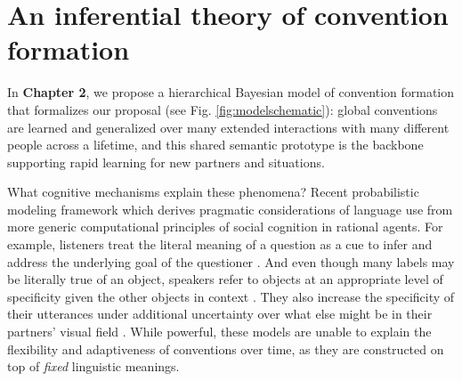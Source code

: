 \documentclass[11pt]{article}
\begin{document}
\vspace{1cm}

\section*{An inferential theory of convention formation}

In \textbf{Chapter 2}, we propose a hierarchical Bayesian model of convention formation that formalizes our proposal (see Fig. \ref{fig:modelschematic}): global conventions are learned and generalized over many extended interactions with many different people across a lifetime, and this shared semantic prototype is the backbone supporting rapid learning for new partners and situations. 

What cognitive mechanisms explain these phenomena? 
Recent probabilistic modeling framework which derives pragmatic considerations of language use from more generic computational principles of social cognition in rational agents.
For example, listeners treat the literal meaning of a question as a cue to infer and address the underlying goal of the questioner {\color{Red} \textbf{}}. 
And even though many labels may be literally true of an object, speakers refer to objects at an appropriate level of specificity given the other objects in context  {\color{Red} \textbf{\cite{graf_animal_2016, monroe2017colors}}}. 
They also increase the specificity of their utterances under additional uncertainty over what else might be in their partners' visual field {\color{Red} \textbf{}}.
While powerful, these models are unable to explain the flexibility and adaptiveness of conventions over time, as they are constructed on top of \emph{fixed} linguistic meanings.
\end{document}
